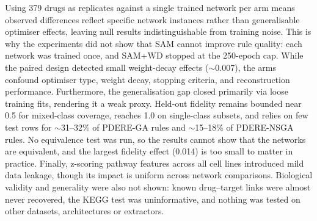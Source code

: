 \label{sec:limitations}

Using 379 drugs as replicates against a single trained network per arm means observed differences reflect specific network instances rather than generalisable optimiser effects, leaving null results indistinguishable from training noise. This is why the experiments did not show that SAM cannot improve rule quality: each network was trained once, and SAM+WD stopped at the 250-epoch cap. While the paired design detected small weight-decay effects ($\sim$0.007), the arms confound optimiser type, weight decay, stopping criteria, and reconstruction performance. Furthermore, the generalisation gap closed primarily via loose training fits, rendering it a weak proxy. Held-out fidelity remains bounded near 0.5 for mixed-class coverage, reaches 1.0 on single-class subsets, and relies on few test rows for $\sim$31--32\% of PDERE-GA rules and $\sim$15--18\% of PDERE-NSGA rules. No equivalence test was run, so the results cannot show that the networks are equivalent, and the largest fidelity effect (0.014) is too small to matter in practice. Finally, z-scoring pathway features across all cell lines introduced mild data leakage, though its impact is uniform across network comparisons. Biological validity and generality were also not shown: known drug--target links were almost never recovered, the KEGG test was uninformative, and nothing was tested on other datasets, architectures or extractors.